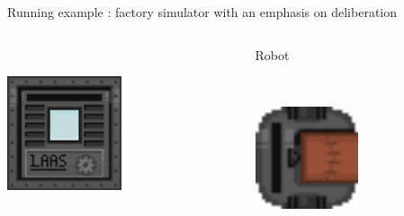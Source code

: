 \begin{frame}{Running example : factory simulator with an emphasis on deliberation}
\begin{columns}
\begin{column}{0.3\textwidth}
            ~~

            \includegraphics[width = 0.5\textwidth]{images/godot/machine_texture.png}

        \end{column}
        \pause
        \begin{column}{0.3\textwidth}
            \centering
            Robot

            ~~

            \includegraphics[width = 0.5\textwidth]{images/godot/robot_texture.png}
        \end{column}
    \end{columns}

            


\end{frame}
